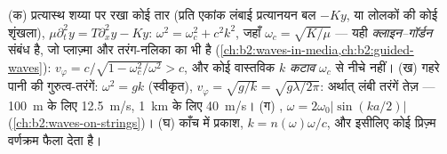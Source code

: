 \begin{example}[परिक्षेपी और अपरिक्षेपी]\label{ex:b2:dispersion-wave-packets:examples}
(क) प्रत्यास्थ शय्या पर रखा कोई तार (प्रति एकांक लंबाई प्रत्यानयन बल $-Ky$,
या लोलकों की कोई शृंखला), $\mu\partial_t^2y = T\partial_x^2y - Ky$: $\omega^2 = \omega_c^2
+ c^2k^2$, जहाँ $\omega_c = \sqrt{K/\mu}$ --- यही \emph{क्लाइन--गॉर्डन}
संबंध है, जो प्लाज़्मा और तरंग-नलिका का भी है
(\cref{ch:b2:waves-in-media,ch:b2:guided-waves}): $v_\varphi = c/\sqrt{1 -
\omega_c^2/\omega^2} > c$, और कोई वास्तविक $k$ \emph{कटाव} $\omega_c$ से नीचे नहीं।
(ख) गहरे पानी की गुरुत्व-तरंगें: $\omega^2 = gk$ (स्वीकृत), $v_\varphi =
\sqrt{g/k} = \sqrt{g\lambda/2\pi}$: अर्थात् लंबी तरंगें तेज़ --- \qty{100}{m} के लिए \qty{12.5}{m/s},
\qty{1}{km} के लिए \qty{40}{m/s}। (ग) , $\omega =
2\omega_0|\sin(ka/2)|$ (\cref{ch:b2:waves-on-strings})। (घ) काँच में प्रकाश,
$k = n(\omega)\omega/c$, और इसीलिए कोई प्रिज़्म वर्णक्रम फैला देता है।
\end{example}

